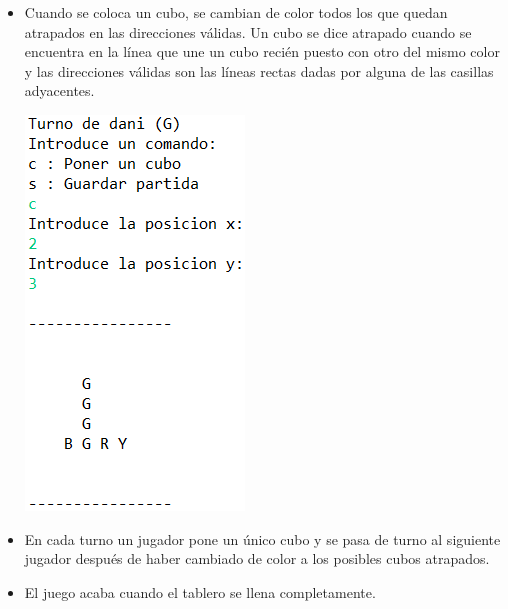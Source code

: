 \documentclass[../DocumentoOficial.tex]{subfiles}
\begin{document}
\begin{sprint}[1]
\begin{itemize}
\item Cuando se coloca un cubo, se cambian de color todos los que quedan atrapados en las direcciones válidas. Un cubo se dice atrapado cuando se encuentra en la línea que une un cubo recién puesto con otro del mismo color y las direcciones válidas son las líneas rectas dadas por alguna de las casillas adyacentes.
\begin{center}
\includegraphics[scale=0.8]{atrapadaaaaaaaas.png}
\end{center}

\item En cada turno un jugador pone un único cubo y se pasa de turno al siguiente jugador después de haber cambiado de color a los posibles cubos atrapados.

\item El juego acaba cuando el tablero se llena completamente.
\end{itemize} 


\end{sprint}
\end{document}
